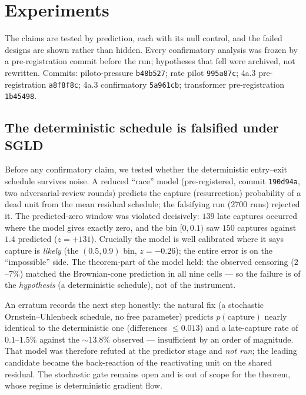 \documentclass[11pt]{article}
\begin{document}
\section{Experiments}\label{sec:experiments}

The claims are tested by prediction, each with its null control, and the failed
designs are shown rather than hidden. Every confirmatory analysis was frozen by
a pre-registration commit before the run; hypotheses that fell were archived, not
rewritten. Commits: piloto-pressure \texttt{b48b527}; rate pilot \texttt{995a87c};
4a.3 pre-registration \texttt{a8f8f8c}; 4a.3 confirmatory \texttt{5a961cb};
transformer pre-registration \texttt{1b45498}.

\subsection{The deterministic schedule is falsified under SGLD}\label{sec:falsif}

Before any confirmatory claim, we tested whether the deterministic entry--exit
schedule survives noise. A reduced ``race'' model (pre-registered, commit
\texttt{190d94a}, two adversarial-review rounds) predicts the capture
(resurrection) probability of a dead unit from the mean residual schedule; the
falsifying run (2700 runs) rejected it. The predicted-zero window was violated
decisively: $139$ late captures occurred where the model gives exactly zero, and
the bin $[0,0.1)$ saw $150$ captures against $1.4$ predicted ($z=+131$). Crucially
the model is well calibrated where it says capture is \emph{likely} (the
$(0.5,0.9)$ bin, $z=-0.26$); the entire error is on the ``impossible'' side. The
theorem-part of the model held: the observed censoring ($2$--$7\%$) matched the
Brownian-cone prediction in all nine cells --- so the failure is of the
\emph{hypothesis} (a deterministic schedule), not of the instrument.

An erratum records the next step honestly: the natural fix (a stochastic
Ornstein--Uhlenbeck schedule, no free parameter) predicts $p(\mathrm{capture})$
nearly identical to the deterministic one (differences $\le0.013$) and a
late-capture rate of $0.1$--$1.5\%$ against the $\sim13.8\%$ observed ---
insufficient by an order of magnitude. That model was therefore refuted at the
predictor stage and \emph{not run}; the leading candidate became the
back-reaction of the reactivating unit on the shared residual. The stochastic
gate remains open and is out of scope for the theorem, whose regime is
deterministic gradient flow.
\end{document}
